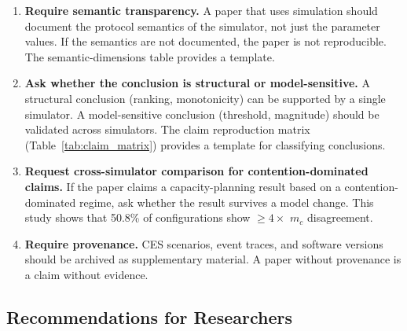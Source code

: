 \documentclass{ams-journal}
\begin{document}
\begin{enumerate}[leftmargin=2em]
\item \textbf{Require semantic transparency.} A paper that uses simulation should document the protocol semantics of the simulator, not just the parameter values. If the semantics are not documented, the paper is not reproducible. The semantic-dimensions table provides a template.

\item \textbf{Ask whether the conclusion is structural or model-sensitive.} A structural conclusion (ranking, monotonicity) can be supported by a single simulator. A model-sensitive conclusion (threshold, magnitude) should be validated across simulators. The claim reproduction matrix (Table~\ref{tab:claim_matrix}) provides a template for classifying conclusions.

\item \textbf{Request cross-simulator comparison for contention-dominated claims.} If the paper claims a capacity-planning result based on a contention-dominated regime, ask whether the result survives a model change. This study shows that 50.8\% of configurations show $\geq 4\times$ $m_c$ disagreement.

\item \textbf{Require provenance.} CES scenarios, event traces, and software versions should be archived as supplementary material. A paper without provenance is a claim without evidence.
\end{enumerate}

\subsection{Recommendations for Researchers}
\end{document}
